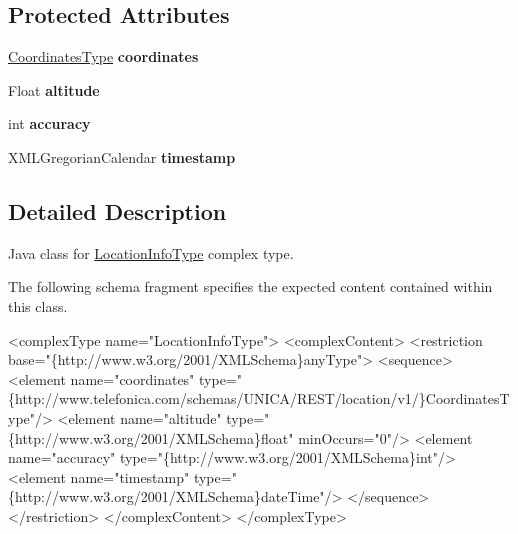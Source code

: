 \subsection*{Protected Attributes}
\begin{DoxyCompactItemize}
\item 
\hypertarget{classcom_1_1telefonica_1_1schemas_1_1unica_1_1rest_1_1location_1_1v1_1_1LocationInfoType_a6703564f24000b51176d2a0675f86173}{
\hyperlink{classcom_1_1telefonica_1_1schemas_1_1unica_1_1rest_1_1location_1_1v1_1_1CoordinatesType}{CoordinatesType} {\bfseries coordinates}}
\label{classcom_1_1telefonica_1_1schemas_1_1unica_1_1rest_1_1location_1_1v1_1_1LocationInfoType_a6703564f24000b51176d2a0675f86173}

\item 
\hypertarget{classcom_1_1telefonica_1_1schemas_1_1unica_1_1rest_1_1location_1_1v1_1_1LocationInfoType_a2205abd0547b3cd5b7002d9c3ac668c8}{
Float {\bfseries altitude}}
\label{classcom_1_1telefonica_1_1schemas_1_1unica_1_1rest_1_1location_1_1v1_1_1LocationInfoType_a2205abd0547b3cd5b7002d9c3ac668c8}

\item 
\hypertarget{classcom_1_1telefonica_1_1schemas_1_1unica_1_1rest_1_1location_1_1v1_1_1LocationInfoType_a90e29268af6621ab09d76b3da5d60eb2}{
int {\bfseries accuracy}}
\label{classcom_1_1telefonica_1_1schemas_1_1unica_1_1rest_1_1location_1_1v1_1_1LocationInfoType_a90e29268af6621ab09d76b3da5d60eb2}

\item 
\hypertarget{classcom_1_1telefonica_1_1schemas_1_1unica_1_1rest_1_1location_1_1v1_1_1LocationInfoType_a55ad5c7c118fad22dd4990016f3f1a71}{
XMLGregorianCalendar {\bfseries timestamp}}
\label{classcom_1_1telefonica_1_1schemas_1_1unica_1_1rest_1_1location_1_1v1_1_1LocationInfoType_a55ad5c7c118fad22dd4990016f3f1a71}

\end{DoxyCompactItemize}


\subsection{Detailed Description}
Java class for \hyperlink{classcom_1_1telefonica_1_1schemas_1_1unica_1_1rest_1_1location_1_1v1_1_1LocationInfoType}{LocationInfoType} complex type.

The following schema fragment specifies the expected content contained within this class.


\begin{DoxyPre}
 <complexType name="LocationInfoType">
   <complexContent>
     <restriction base="\{http://www.w3.org/2001/XMLSchema\}anyType">
       <sequence>
         <element name="coordinates" type="\{http://www.telefonica.com/schemas/UNICA/REST/location/v1/\}CoordinatesType"/>
         <element name="altitude" type="\{http://www.w3.org/2001/XMLSchema\}float" minOccurs="0"/>
         <element name="accuracy" type="\{http://www.w3.org/2001/XMLSchema\}int"/>
         <element name="timestamp" type="\{http://www.w3.org/2001/XMLSchema\}dateTime"/>
       </sequence>
     </restriction>
   </complexContent>
 </complexType>
 \end{DoxyPre}
 

